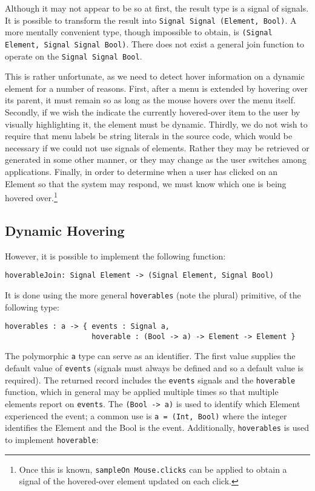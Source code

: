 \documentclass{article}
\begin{document}
Although it may not appear to be so at first, the result type is a signal of
signals. It is possible to transform the result into \texttt{Signal Signal
(Element, Bool)}. A more mentally convenient type, though impossible to obtain,
is \texttt{(Signal Element, Signal Signal Bool)}. There does not exist a general
join function to operate on the \texttt{Signal Signal Bool}.

This is rather unfortunate, as we need to detect hover information on a dynamic
element for a number of reasons. First, after a menu is extended by hovering
over its parent, it must remain so as long as the mouse hovers over the menu
itself. Secondly, if we wish the indicate the currently hovered-over item to the
user by visually highlighting it, the element must be dynamic. Thirdly, we do
not wish to require that menu labels be string literals in the source code,
which would be necessary if we could not use signals of elements. Rather they
may be retrieved or generated in some other manner, or they may change as the
user switches among applications. Finally, in order to determine when a user has
clicked on an Element so that the system may respond, we must know which one is
being hovered over.\footnote{Once this is known, \texttt{sampleOn Mouse.clicks}
can be applied to obtain a signal of the hovered-over element updated on each
click.}

\subsection{Dynamic Hovering}
However, it is possible to implement the following function:

\texttt{hoverableJoin: Signal Element -\textgreater{} (Signal Element, Signal Bool)}

It is done using the more general \texttt{hoverables} (note the plural)
primitive, of the following type:

\begin{verbatim}
hoverables : a -> { events : Signal a,
                    hoverable : (Bool -> a) -> Element -> Element }
\end{verbatim}

The polymorphic \texttt{a} type can serve as an identifier. The first
value supplies the default value of \texttt{events} (signals must always
be defined and so a default value is required). The returned record
includes the \texttt{events} signals and the \texttt{hoverable}
function, which in general may be applied multiple times so that
multiple elements report on \texttt{events}. The
\texttt{(Bool -\textgreater{} a)} is used to identify which Element
experienced the event; a common use is \texttt{a = (Int, Bool)} where
the integer identifies the Element and the Bool is the event.
Additionally, \texttt{hoverables} is used to implement
\texttt{hoverable}:
\end{document}
